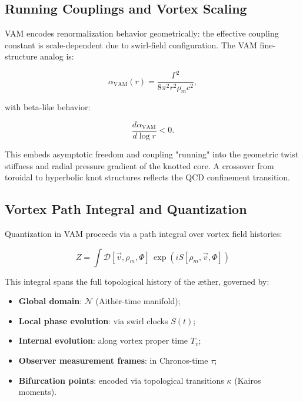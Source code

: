 \subsection{Running Couplings and Vortex Scaling}

VAM encodes renormalization behavior geometrically: the effective coupling constant is scale-dependent due to swirl-field configuration. The VAM fine-structure analog is:

\begin{equation}
\alpha_{\text{VAM}}(r) = \frac{\Gamma^2}{8\pi^2 r^2 \rho_{\scriptscriptstyle\boldsymbol\!m} c^2},
\end{equation}

with beta-like behavior:

\begin{equation}
\frac{d \alpha_{\text{VAM}}}{d \log r} < 0.
\end{equation}

This embeds asymptotic freedom and coupling "running" into the geometric twist stiffness and radial pressure gradient of the knotted core. A crossover from toroidal to hyperbolic knot structures reflects the QCD confinement transition.

\subsection{Vortex Path Integral and Quantization}

Quantization in VAM proceeds via a path integral over vortex field histories:

\begin{equation}
Z = \int \mathcal{D}[\vec{v}, \rho_{\scriptscriptstyle\boldsymbol\!m}, \Phi] \, \exp\left( i S[\rho_{\scriptscriptstyle\boldsymbol\!m}, \vec{v}, \Phi] \right)
\end{equation}

This integral spans the full topological history of the æther, governed by:

\begin{itemize}
    \item \textbf{Global domain}: \( \mathcal{N} \) (Aithēr-time manifold);
    \item \textbf{Local phase evolution}: via swirl clocks \( S(t) \);
    \item \textbf{Internal evolution}: along vortex proper time \( T_v \);
    \item \textbf{Observer measurement frames}: in Chronos-time \( \tau \);
    \item \textbf{Bifurcation points}: encoded via topological transitions \( \kappa \) (Kairos moments).
\end{itemize}

